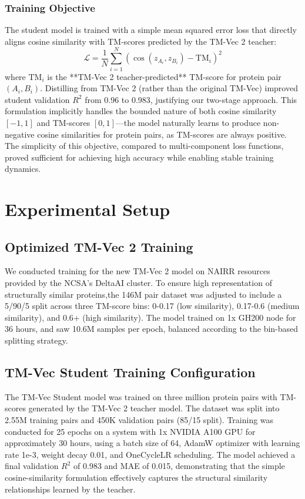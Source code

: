 \documentclass[runningheads]{llncs}
\begin{document}
\subsubsection{Training Objective}
The student model is trained with a simple mean squared error loss that directly aligns cosine similarity with TM-scores predicted by the TM-Vec 2 teacher:
\begin{equation}
\mathcal{L} = \frac{1}{N} \sum_{i=1}^{N} \left( \cos(z_{A_i}, z_{B_i}) - \text{TM}_i \right)^2
\end{equation}
where $\text{TM}_i$ is the **TM-Vec 2 teacher-predicted** TM-score for protein pair $(A_i, B_i)$. Distilling from TM-Vec 2 (rather than the original TM-Vec) improved student validation $R^2$ from 0.96 to 0.983, justifying our two-stage approach. This formulation implicitly handles the bounded nature of both cosine similarity $[-1, 1]$ and TM-scores $[0, 1]$---the model naturally learns to produce non-negative cosine similarities for protein pairs, as TM-scores are always positive. The simplicity of this objective, compared to multi-component loss functions, proved sufficient for achieving high accuracy while enabling stable training dynamics. 

\section{Experimental Setup}

\subsection{Optimized TM-Vec 2 Training} %

We conducted training for the new TM-Vec 2 model on NAIRR resources provided by the NCSA's DeltaAI cluster. To ensure high representation of structurally similar proteins,the 146M pair dataset was adjusted to include a 5/90/5 split across three TM-score bins: 0-0.17 (low similarity), 0.17-0.6 (medium similarity), and 0.6+ (high similarity). The model trained on 1x GH200 node for 36 hours, and saw 10.6M samples per epoch, balanced according to the bin-based splitting strategy.

\subsection{TM-Vec Student Training Configuration}

The TM-Vec Student model was trained on three million protein pairs with TM-scores generated by the TM-Vec 2 teacher model. The dataset was split into 2.55M training pairs and 450K validation pairs (85/15 split). Training was conducted for 25 epochs on a system with 1x NVIDIA A100 GPU for approximately 30 hours, using a batch size of 64, AdamW optimizer with learning rate 1e-3, weight decay 0.01, and OneCycleLR scheduling. The model achieved a final validation $R^2$ of 0.983 and MAE of 0.015, demonstrating that the simple cosine-similarity formulation effectively captures the structural similarity relationships learned by the teacher.
\end{document}
